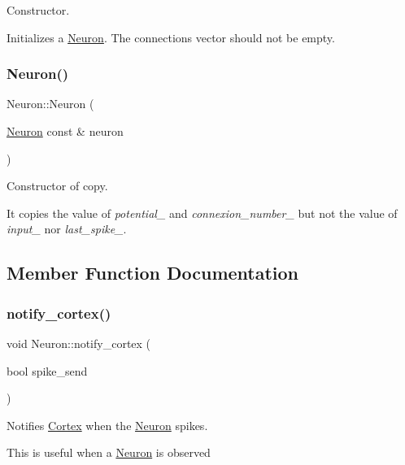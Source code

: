 Constructor. 

Initializes a \hyperlink{class_neuron}{Neuron}. The connections vector should not be empty. \hypertarget{class_neuron_a3c1af2530cdcbb2882ff6d86620509b1}{}\label{class_neuron_a3c1af2530cdcbb2882ff6d86620509b1} 
\subsubsection{\texorpdfstring{Neuron()}{Neuron()}\hspace{0.1cm}{\footnotesize\ttfamily [2/2]}}
{\footnotesize\ttfamily Neuron\+::\+Neuron (\begin{DoxyParamCaption}\item[{\hyperlink{class_neuron}{Neuron} const \&}]{neuron }\end{DoxyParamCaption})}



Constructor of copy. 

It copies the value of {\itshape potential\+\_\+} and {\itshape connexion\+\_\+number\+\_\+} but not the value of {\itshape input\+\_\+} nor {\itshape last\+\_\+spike\+\_\+}. 

\subsection{Member Function Documentation}
\hypertarget{class_neuron_a741570188e5a493e183ef37a15d628e8}{}\label{class_neuron_a741570188e5a493e183ef37a15d628e8} 
\subsubsection{\texorpdfstring{notify\+\_\+cortex()}{notify\_cortex()}}
{\footnotesize\ttfamily void Neuron\+::notify\+\_\+cortex (\begin{DoxyParamCaption}\item[{bool}]{spike\+\_\+send }\end{DoxyParamCaption})}



Notifies \hyperlink{class_cortex}{Cortex} when the \hyperlink{class_neuron}{Neuron} spikes. 

This is useful when a \hyperlink{class_neuron}{Neuron} is observed \hypertarget{class_neuron_ac4d5b2ee5e8c26ecab684afa3f85ca6e}{}\label{class_neuron_ac4d5b2ee5e8c26ecab684afa3f85ca6e} 
